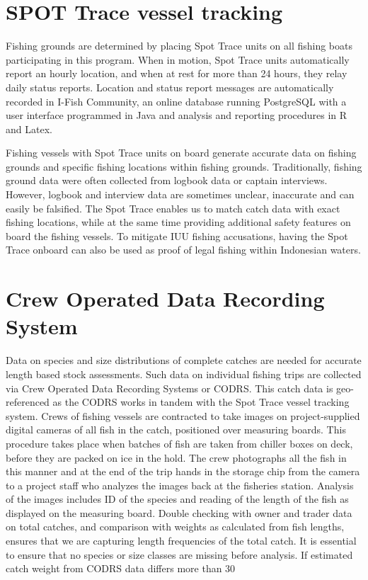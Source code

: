 \section{SPOT Trace vessel tracking}

Fishing grounds are determined by placing Spot Trace units on all fishing boats participating in this program. When in motion, Spot Trace units automatically report an hourly location, and when at rest for more than 24 hours, they relay daily status reports. Location and status report messages are automatically recorded in I-Fish Community, an online database running PostgreSQL with a user interface programmed in Java and analysis and reporting procedures in R and Latex.

Fishing vessels with Spot Trace units on board generate accurate data on fishing grounds and specific fishing locations within fishing grounds. Traditionally, fishing ground data were often collected from logbook data or captain interviews. However, logbook and interview data are sometimes unclear, inaccurate and can easily be falsified. The Spot Trace enables us to match catch data with exact fishing locations, while at the same time providing additional safety features on board the fishing vessels. To mitigate IUU fishing accusations, having the Spot Trace onboard can also be used as proof of legal fishing within Indonesian waters.

\section{Crew Operated Data Recording System}

Data on species and size distributions of complete catches are needed for accurate length based stock assessments. Such data on individual fishing trips are collected via Crew Operated Data Recording Systems or CODRS. This catch data is geo-referenced as the CODRS works in tandem with the Spot Trace vessel tracking system. Crews of fishing vessels are contracted to take images on project-supplied digital cameras of all fish in the catch, positioned over measuring boards. This procedure takes place when batches of fish are taken from chiller boxes on deck, before they are packed on ice in the hold. The crew photographs all the fish in this manner and at the end of the trip hands in the storage chip from the camera to a project staff who analyzes the images back at the fisheries station. Analysis of the images includes ID of the species and reading of the length of the fish as displayed on the measuring board. Double checking with owner and trader data on total catches, and comparison with weights as calculated from fish lengths, ensures that we are capturing length frequencies of the total catch. It is essential to ensure that no species or size classes are missing before analysis. If estimated catch weight from CODRS data differs more than 30%

